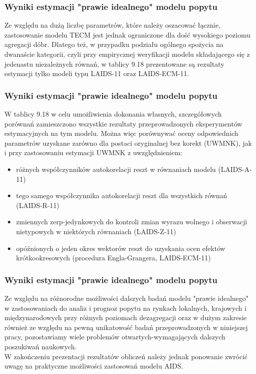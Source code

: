 \documentclass[11pt,usenames,dvipsnames,svgnames,x11names]{beamer}\usepackage[]{graphicx}\usepackage[]{color}
\theoremstyle{definition}
\theoremstyle{remark}
\begin{document}
\begin{frame}
\frametitle{Wyniki estymacji "prawie idealnego" modelu popytu }
Ze względu na dużą liczbę parametrów, które należy oszacować łącznie, zastosowanie modelu TECM jest jednak ograniczone dla dość wysokiego poziomu agregacji dóbr. Dlatego też, w przypadku podziału ogólnego spożycia na dwanaście kategorii, czyli przy empirycznej weryfikacji modelu składającego się z jedenastu niezależnych równań, w tablicy 9.18  prezentowane są rezultaty estymacji tylko modeli typu LAIDS-11 oraz LAIDS-ECM-11.
\end{frame}

\begin{frame}
\frametitle{Wyniki estymacji "prawie idealnego" modelu popytu }
W tablicy 9.18 w celu umożliwienia dokonania własnych, szczegółowych porównań zamieszczono wszystkie rezultaty przeprowadzonych eksperymentów estymacyjnych na tym modelu. Można więc porównywać oceny odpowiednich parametrów uzyskane zarówno dla postaci oryginalnej bez korekt (UWMNK), jak i przy zastosowaniu estymacji UWMNK z uwzględnieniem:
\begin{itemize}
\item różnych współczynników autokorelacji reszt w równaniach modelu (LAIDS-A-11)
\item tego samego współczynnika autokorelacji reszt dla wszystkich równań (LAIDS-R-11)
\item zmiennych zerp-jedynkowych do kontroli zmian wyrazu wolnego i obserwacji nietypowych w niektórych równaniach (LAIDS-Z-11)
\item opóźnionych o jeden okres wektorów reszt do uzyskania ocen efektów krótkookresowych (procedura Engla-Grangera, LAIDS-ECM-11)
\end{itemize}

\end{frame}

\begin{frame}
\frametitle{Wyniki estymacji "prawie idealnego" modelu popytu }
Ze względu na różnorodne możliwości dalszych badań modelu "prawie idealnego" w zastosowaniach do analiz i prognoz popytu na rynkach lokalnych, krajowych i międzynarodowych przy różnych poziomach dezagregacji oraz w dużym zakresie również ze względu na pewną unikatowość badań przeprowadzonych w niniejszej pracy, pozostawiamy wiele problemów otwartych-wymagających dalszych poszukiwań naukowych.\\
W zakończeniu prezentacji rezultatów obliczeń należy jednak ponowanie zwrócić uwagę na praktyczne możliwości zastosowań modelu AIDS.
\end{frame}
\end{document}
